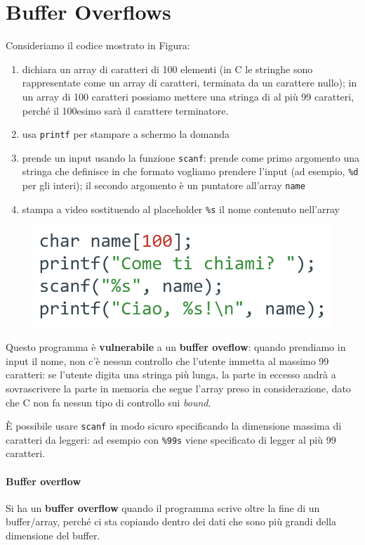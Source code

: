 \chapter{Buffer Overflows}

Consideriamo il codice mostrato in Figura:
\begin{enumerate}
    \item dichiara un array di caratteri
    di 100 elementi (in C le stringhe sono rappresentate come un array di 
    caratteri, terminata da un carattere nullo); in un array di 100 caratteri possiamo
    mettere una stringa di al più 99 caratteri, perché il 100esimo sarà il 
    carattere terminatore.
    \item usa \texttt{printf} per stampare a schermo la domanda
    \item prende un input usando la funzione \texttt{scanf}: prende come primo 
    argomento una stringa che definisce in che formato vogliamo prendere l'input (ad esempio,
    \texttt{\%d} per gli interi); il secondo argomento è un puntatore all'array \texttt{name}
    \item stampa a video sostituendo al placeholder \texttt{\%s} il nome contenuto nell'array
\end{enumerate}

\begin{figure}[ht]
    \centering
    \includegraphics[width=0.5\linewidth]{images/codeex.png}
    \label{fig:ex-cprog}
\end{figure}

Questo programma è \textbf{vulnerabile} a un \textbf{buffer oveflow}: quando
prendiamo in input il nome, non c'è nessun controllo che l'utente
immetta al massimo 99 caratteri: se l'utente digita una stringa più lunga,
la parte in eccesso andrà a sovrascrivere la parte in memoria che 
segue l'array preso in considerazione, dato che C non fa nessun tipo di controllo sui \textit{bound}.

È possibile usare \texttt{scanf} in modo sicuro specificando la dimensione massima di caratteri da leggeri: ad esempio 
con \texttt{\%99s} viene specificato di legger al più 99 caratteri.


\subsubsection{Buffer overflow}
Si ha un \textbf{buffer overflow} quando il programma scrive oltre la 
fine di un buffer/array, perché ci sta copiando dentro dei dati che sono più 
grandi della dimensione del buffer.

